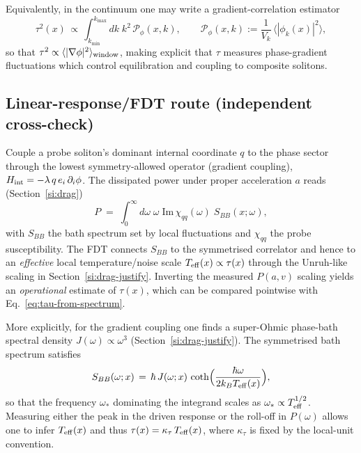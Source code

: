 \documentclass[11pt]{article}
\begin{document}
Equivalently, in the continuum one may write a gradient-correlation estimator
\begin{equation}
  \tau^2(x) \,\propto\, \int_{k_{\min}}^{k_{\max}}\! dk\; k^2\, \mathcal P_{\phi}(x,k),\qquad \mathcal P_{\phi}(x,k):=\frac{1}{V_k}\,\big\langle |\phi_k(x)|^2\big\rangle,
\end{equation}
so that $\tau^2\propto \langle |\nabla\phi|^2\rangle_{\rm window}$, making explicit that $\tau$ measures phase-gradient fluctuations which control equilibration and coupling to composite solitons.

\subsection*{Linear-response/FDT route (independent cross-check)}
Couple a probe soliton's dominant internal coordinate $q$ to the phase sector through the lowest symmetry-allowed operator (gradient coupling), $H_{\rm int} = -\lambda\, q\, e_i\,\partial_i\phi$. The dissipated power under proper acceleration $a$ reads (Section~\ref{si:drag})
\begin{equation}
  P \;=\; \int_0^{\infty}\! d\omega\; \omega\; \mathrm{Im}\,\chi_{qq}(\omega)\; S_{BB}(x;\omega),
\end{equation}
with $S_{BB}$ the bath spectrum set by local fluctuations and $\chi_{qq}$ the probe susceptibility. The FDT connects $S_{BB}$ to the symmetrised correlator and hence to an \emph{effective} local temperature/noise scale $T_{\rm eff}(x) \propto \tau(x)$ through the Unruh-like scaling in Section~\ref{si:drag-justify}. Inverting the measured $P(a,v)$ scaling yields an \emph{operational} estimate of $\tau(x)$, which can be compared pointwise with Eq.~\eqref{eq:tau-from-spectrum}.

More explicitly, for the gradient coupling one finds a super-Ohmic phase-bath spectral density $J(\omega)\propto\omega^3$ (Section~\ref{si:drag-justify}). The symmetrised bath spectrum satisfies
\begin{equation}
  S_{BB}(\omega;x) \,=\, \hbar\, J(\omega;x)\, \coth\!\Big(\frac{\hbar\omega}{2k_B T_{\rm eff}(x)}\Big),
\end{equation}
so that the frequency $\omega_*$ dominating the integrand scales as $\omega_*\propto T_{\rm eff}^{1/2}$. Measuring either the peak in the driven response or the roll-off in $P(\omega)$ allows one to infer $T_{\rm eff}(x)$ and thus $\tau(x)=\kappa_\tau\, T_{\rm eff}(x)$, where $\kappa_\tau$ is fixed by the local-unit convention.
\end{document}
